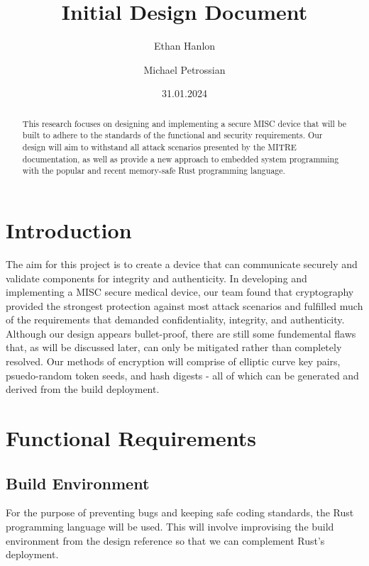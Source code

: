 \documentclass{prace}
\title{Initial Design Document}
\date{31.01.2024}
\author[1]{Ethan Hanlon}
\author[1]{Michael Petrossian}
\affiliation{San Francisco State University, 1600 Holloway Avenue, San Francisco, CA 94132, USA}
\begin{document}
\maketitle

\begin{abstract}
This research focuses on designing and implementing a secure MISC device that will be built to adhere to the standards of the functional and security requirements. Our design will 
aim to withstand all attack scenarios presented by the MITRE documentation, as well as provide a new approach to embedded system programming with the popular and recent memory-safe Rust programming language. 
\end{abstract}

\section{Introduction}

The aim for this project is to create a device that can communicate securely and validate components for integrity and authenticity.
In developing and implementing a MISC secure medical device, our team found that cryptography
provided the strongest protection against most attack scenarios and fulfilled much of the requirements
that demanded confidentiality, integrity, and authenticity. Although our design appears bullet-proof, there are still
some fundemental flaws that, as will be discussed later, can only be mitigated rather than completely resolved. Our methods of encryption will comprise of elliptic curve key pairs, 
psuedo-random token seeds, and hash digests - all of which can be generated and derived from the build deployment.

\section{Functional Requirements}

\subsection{Build Environment}

For the purpose of preventing bugs and keeping safe coding standards, the Rust programming language will be used.
This will involve improvising the build environment from the design reference so that we can complement Rust's deployment. 
\end{document}
